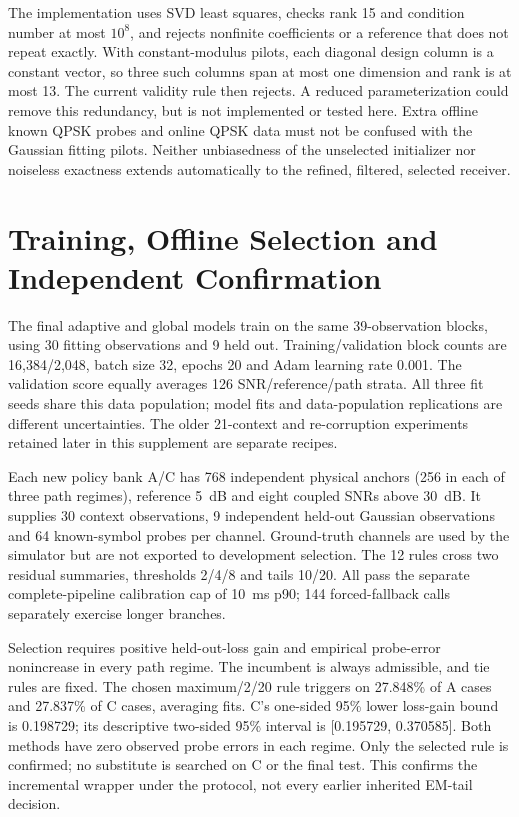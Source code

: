 The implementation uses SVD least squares, checks rank 15 and condition number at most $10^8$, and rejects nonfinite coefficients or a reference that does not repeat exactly. With constant-modulus pilots, each diagonal design column is a constant vector, so three such columns span at most one dimension and rank is at most 13. The current validity rule then rejects. A reduced parameterization could remove this redundancy, but is not implemented or tested here. Extra offline known QPSK probes and online QPSK data must not be confused with the Gaussian fitting pilots. Neither unbiasedness of the unselected initializer nor noiseless exactness extends automatically to the refined, filtered, selected receiver.

\section{Training, Offline Selection and Independent Confirmation}
The final adaptive and global models train on the same 39-observation blocks, using 30 fitting observations and 9 held out. Training/validation block counts are 16,384/2,048, batch size 32, epochs 20 and Adam learning rate 0.001. The validation score equally averages 126 SNR/reference/path strata. All three fit seeds share this data population; model fits and data-population replications are different uncertainties. The older 21-context and re-corruption experiments retained later in this supplement are separate recipes.

Each new policy bank A/C has 768 independent physical anchors (256 in each of three path regimes), reference 5~dB and eight coupled SNRs above 30~dB. It supplies 30 context observations, 9 independent held-out Gaussian observations and 64 known-symbol probes per channel. Ground-truth channels are used by the simulator but are not exported to development selection. The 12 rules cross two residual summaries, thresholds 2/4/8 and tails 10/20. All pass the separate complete-pipeline calibration cap of 10~ms p90; 144 forced-fallback calls separately exercise longer branches.

Selection requires positive held-out-loss gain and empirical probe-error nonincrease in every path regime. The incumbent is always admissible, and tie rules are fixed. The chosen maximum/2/20 rule triggers on 27.848\% of A cases and 27.837\% of C cases, averaging fits. C's one-sided 95\% lower loss-gain bound is 0.198729; its descriptive two-sided 95\% interval is [0.195729, 0.370585]. Both methods have zero observed probe errors in each regime. Only the selected rule is confirmed; no substitute is searched on C or the final test. This confirms the incremental wrapper under the protocol, not every earlier inherited EM-tail decision.

